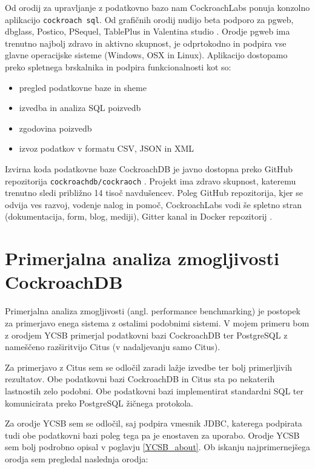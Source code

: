 \documentclass[a4paper, 12pt]{book}
\begin{document}
Od orodij za upravljanje z podatkovno bazo nam CockroachLabs ponuja konzolno aplikacijo \texttt{cockroach sql}. Od grafičnih orodij nudijo beta podporo za pgweb, dbglass, Postico, PSequel, TablePlus in Valentina studio \cite{CRDB-meta-vizualizers}. Orodje pgweb ima trenutno najbolj zdravo in aktivno skupnost, je odprtokodno in podpira vse glavne operacijske sisteme (Windows, OSX in Linux). Aplikacijo dostopamo preko spletnega brskalnika in podpira funkcionalnosti kot so:

\begin{itemize}
    \item pregled podatkovne baze in sheme
    \item izvedba in analiza SQL poizvedb
    \item zgodovina poizvedb
    \item izvoz podatkov v formatu CSV, JSON in XML
\end{itemize}

Izvirna koda podatkovne baze CockroachDB je javno dostopna preko GitHub repozitorija \texttt{cockroachdb/cockraoch} \cite{cockroachdb/cockroach}. Projekt ima zdravo skupnost, kateremu trenutno sledi približno 14 tisoč navdušencev. Poleg GitHub repozitorija, kjer se odvija ves razvoj, vodenje nalog in pomoč, CockroachLabs vodi še spletno stran \cite{CRDB-home} (dokumentacija, form, blog, mediji), Gitter kanal \cite{CRDB-gitter} in Docker repozitorij \cite{CRDB-docker}.

\chapter{Primerjalna analiza zmogljivosti CockroachDB}

Primerjalna analiza zmogljivosti (angl. performance benchmarking) je postopek za primerjavo enega sistema z ostalimi podobnimi sistemi. V mojem primeru bom z orodjem YCSB primerjal podatkovni bazi CockroachDB ter PostgreSQL z nameščeno razširitvijo Citus (v nadaljevanju samo Citus). 

Za primerjavo z Citus sem se odločil zaradi lažje izvedbe ter bolj primerljivih rezultatov. Obe podatkovni bazi CockroachDB in Citus sta po nekaterih lastnostih zelo podobni. Obe podatkovni bazi implementirat standardni SQL ter komunicirata preko PostgreSQL žičnega protokola. 

Za orodje YCSB sem se odločil, saj podpira vmesnik JDBC, katerega podpirata tudi obe podatkovni bazi poleg tega pa je enostaven za uporabo. Orodje YCSB sem bolj podrobno opisal v poglavju \ref{YCSB_about}. Ob iskanju najprimernejšega orodja sem pregledal naslednja orodja:
\end{document}
